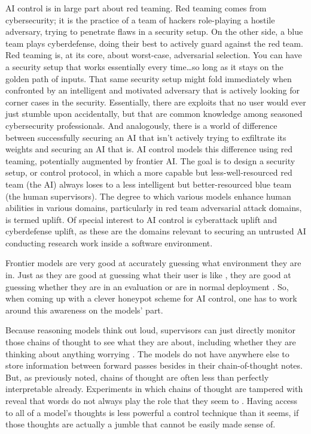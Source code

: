 AI control is in large part about red teaming. Red teaming comes from
cybersecurity; it is the practice of a team of hackers role-playing a hostile
adversary, trying to penetrate flaws in a security setup. On the other side, a
blue team plays cyberdefense, doing their best to actively guard against the
red team. Red teaming is, at its core, about worst-case, adversarial selection.
You can have a security setup that works essentially every time\ldots so long
as it stays on the golden path of inputs. That same security setup might fold
immediately when confronted by an intelligent and motivated adversary that is
actively looking for corner cases in the security. Essentially, there are
exploits that no user would ever just stumble upon accidentally, but that are
common knowledge among seasoned cybersecurity professionals. And analogously,
there is a world of difference between successfully securing an AI that isn't
actively trying to exfiltrate its weights and securing an AI that is. AI
control models this difference using red teaming, potentially augmented by
frontier AI. The goal is to design a security setup, or control protocol, in
which a more capable but less-well-resourced red team (the AI) always loses to
a less intelligent but better-resourced blue team (the human supervisors). The
degree to which various models enhance human abilities in various domains,
particularly in red team adversarial attack domains, is termed uplift. Of
special interest to AI control is cyberattack uplift and cyberdefense uplift,
as these are the domains relevant to securing an untrusted AI conducting
research work inside a software environment.

Frontier models are very good at accurately guessing what environment they are
in. Just as they are good at guessing what their user is like
\cite{derner2024truesight}, they are good at guessing whether they are in an
evaluation or are in normal deployment \cite{needham2025know}. So, when coming
up with a clever honeypot scheme for AI control, one has to work around this
awareness on the models' part.

Because reasoning models think out loud, supervisors can just directly monitor
those chains of thought to see what they are about, including whether they are
thinking about anything worrying \cite{baker2025monitoring}. The models do not
have anywhere else to store information between forward passes besides in their
chain-of-thought notes. But, as previously noted, chains of thought are often
less than perfectly interpretable already. Experiments in which chains of
thought are tampered with reveal that words do not always play the role that
they seem to \cite{turpin2023unfaithful,chen2025unfaithful}. Having access to
all of a model's thoughts is less powerful a control technique than it seems,
if those thoughts are actually a jumble that cannot be easily made sense of.

